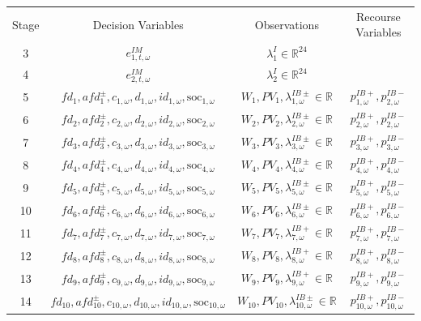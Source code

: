 \documentclass{article}
\newcommand{\R}{\mathbb{R}}
\newcommand{\soc}{\text{soc}}
\begin{document}
\begin{table}
\begin{tabular}{c c c c}
	Stage & Decision Variables & Observations & Recourse Variables \\
	3 & $e^{IM}_{1, t, \omega}$ & $\lambda^I_1 \in \R^{24}$ &  \\
	4 & $e^{IM}_{2, t, \omega}$ & $\lambda^I_2 \in \R^{24}$ &  \\
	5 & $fd_1, afd^{\pm}_1, c_{1, \omega}, d_{1, \omega}, id_{1, \omega}, \soc_{1, \omega}$ & $W_1, PV_1, \lambda^{IB\pm}_{1, \omega} \in \R$ & $p^{IB+}_{1, \omega}, p^{IB-}_{2, \omega}$  \\
	6 & $fd_2, afd^{\pm}_2, c_{2, \omega}, d_{2, \omega}, id_{2, \omega}, \soc_{2, \omega}$ & $W_2, PV_2, \lambda^{IB\pm}_{2, \omega} \in \R$ & $p^{IB+}_{2, \omega}, p^{IB-}_{2, \omega}$ \\
	7 & $fd_3, afd^{\pm}_3, c_{3, \omega}, d_{3, \omega}, id_{3, \omega}, \soc_{3, \omega}$  & $W_3, PV_3, \lambda^{IB\pm}_{3, \omega} \in \R$ & $p^{IB+}_{3, \omega}, p^{IB-}_{3, \omega}$ \\
	8 & $fd_4, afd^{\pm}_4, c_{4, \omega}, d_{4, \omega}, id_{4, \omega}, \soc_{4, \omega}$ & $W_4, PV_4, \lambda^{IB\pm}_{4, \omega} \in \R$ & $p^{IB+}_{4, \omega}, p^{IB-}_{4, \omega}$ \\
	9 & $fd_5, afd^{\pm}_5, c_{5, \omega}, d_{5, \omega}, id_{5, \omega}, \soc_{5, \omega}$ & $W_5, PV_5, \lambda^{IB\pm}_{5, \omega} \in \R$ & $p^{IB+}_{5, \omega}, p^{IB-}_{5, \omega}$\\
	10 & $fd_6, afd^{\pm}_6, c_{6, \omega}, d_{6, \omega}, id_{6, \omega}, \soc_{6, \omega}$ & $W_6, PV_6, \lambda^{IB\pm}_{6, \omega} \in \R$ & $p^{IB+}_{6, \omega}, p^{IB-}_{6, \omega}$ \\
	11 & $fd_7, afd^{\pm}_7, c_{7, \omega}, d_{7, \omega}, id_{7, \omega}, \soc_{7, \omega}$ & $W_7, PV_7, \lambda^{IB+}_{7, \omega} \in \R$ & $p^{IB+}_{7, \omega}, p^{IB-}_{7, \omega}$ \\
	12 & $fd_8, afd^{\pm}_8, c_{8, \omega}, d_{8, \omega}, id_{8, \omega}, \soc_{8, \omega}$ & $W_8, PV_8, \lambda^{IB+}_{8, \omega} \in \R$ & $p^{IB+}_{8, \omega}, p^{IB-}_{8, \omega}$ \\
	13 & $fd_9, afd^{\pm}_9, c_{9, \omega}, d_{9, \omega}, id_{9, \omega}, \soc_{9, \omega}$ & $W_9, PV_9, \lambda^{IB+}_{9, \omega} \in \R$ & $p^{IB+}_{9, \omega}, p^{IB-}_{9, \omega}$\\
	14 & $fd_{10}, afd^{\pm}_{10}, c_{10, \omega}, d_{10, \omega}, id_{10, \omega}, \soc_{10, \omega}$ & $W_{10}, PV_{10}, \lambda^{IB\pm}_{10, \omega} \in \R$ & $p^{IB+}_{10, \omega}, p^{IB-}_{10, \omega}$ \\

\end{tabular}
\end{table}
\end{document}
